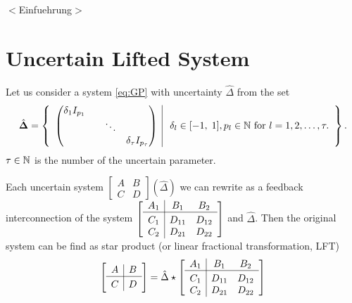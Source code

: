 %





{\color{red}$<$Einfuehrung$>$}


\section{Uncertain Lifted System} 

Let us consider a system \eqref{eq:GP} with uncertainty $\hat{\Delta} $ from the set 
\begin{align}
\label{eq:Delta_hat_set}
\hat{\mathbf{\Delta}} =
\left\{\begin{array}{c|c}
\begin{pmatrix}
\delta_1 I_{p_1} & & &\\
& & \ddots &\\
& & &\delta_\tau I_{p_\tau}
\end{pmatrix} & \; \delta_l \in [-1,\;1], p_l \in {\mathbb{N}} \text{ for } l = 1, 2, \dots , \tau .
\end{array} \right\}.
\end{align}
$\tau \in {\mathbb{N}}$ is the number of the uncertain parameter.

Each uncertain system $\left[\begin{array}{c|c}
A & B \\\hline C &D
\end{array}\right]\left(\hat{\Delta}\right)$
we can rewrite as a feedback interconnection of the system 
$
\left[\begin{array}{c|c c}
A_1 & B_1 & B_2 \\\hline
C_1 & D_{11} & D_{12} \\
C_2 & D_{21} & D_{22}
\end{array}\right]
$
and $\hat{\Delta}$. 
Then the original system can be find as star product (or linear fractional transformation, LFT)
\begin{align}
\left[\begin{array}{c|c}
A & B \\\hline C &D
\end{array}\right] = \hat{\Delta} \star \left[\begin{array}{c|c c}
A_1 & B_1 & B_2 \\\hline
C_1 & D_{11} & D_{12} \\
C_2 & D_{21} & D_{22}	
\end{array}\right]
\end{align}

